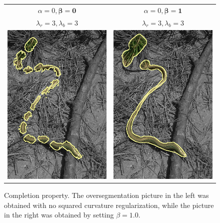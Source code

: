 \begin{figure}
\center
\begin{tabular}{cc}
$\alpha=0, \mathbf{\beta=0}$ & $\alpha=0, \mathbf{\beta=1}$\\
$\lambda_r = 3, \lambda_b = 3$ & $\lambda_r = 3, \lambda_b = 3$\\
 	\includegraphics[scale=0.25]{figures/chapter8/completion/graphseg/alpha-0.0/beta-0.0/gamma-3.0/radius-7/corrected-seg.png} & 
 	\includegraphics[scale=0.25]{figures/chapter8/completion/graphseg/alpha-0.0/beta-1.0/gamma-3.0/radius-7/corrected-seg.png}
\end{tabular}	
\caption{Completion property. The oversegmentation picture in the left was obtained with no squared curvature regularization, while the picture in the right was obtained by setting $\beta=1.0$. }
\label{fig:ch8-segmentation-curvature-completion}
\end{figure}

